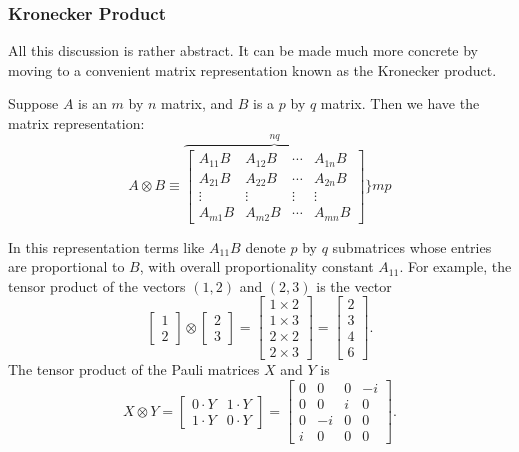 \subsubsection{Kronecker Product}

All this discussion is rather abstract. It can be made much more concrete by moving to a convenient matrix representation known as the Kronecker product. 

Suppose $A$ is an $m$ by $n$ matrix, and $B$ is a $p$ by $q$ matrix. Then we have the matrix representation:
\begin{equation}
    A \otimes B \equiv \overbrace{\left[\begin{array}{cccc}
A_{11} B & A_{12} B & \cdots & A_{1 n} B \\
A_{21} B & A_{22} B & \cdots & A_{2 n} B \\
\vdots & \vdots & \vdots & \vdots \\
A_{m 1} B & A_{m 2} B & \cdots & A_{m n} B
\end{array}\right]}^{n q}\} m p
\end{equation}

In this representation terms like $A_{11} B$ denote $p$ by $q$ submatrices whose entries are proportional to $B$, with overall proportionality constant $A_{11}$. For example, the tensor product of the vectors $(1,2)$ and $(2,3)$ is the vector
\begin{equation}
    \left[\begin{array}{l}
1 \\
2
\end{array}\right] \otimes\left[\begin{array}{l}
2 \\
3
\end{array}\right]=\left[\begin{array}{l}
1 \times 2 \\
1 \times 3 \\
2 \times 2 \\
2 \times 3
\end{array}\right]=\left[\begin{array}{l}
2 \\
3 \\
4 \\
6
\end{array}\right].
\end{equation}
The tensor product of the Pauli matrices $X$ and $Y$ is
\begin{equation}
    X \otimes Y=\left[\begin{array}{cc}
0 \cdot Y & 1 \cdot Y \\
1 \cdot Y & 0 \cdot Y
\end{array}\right]=\left[\begin{array}{cccc}
0 & 0 & 0 & -i \\
0 & 0 & i & 0 \\
0 & -i & 0 & 0 \\
i & 0 & 0 & 0
\end{array}\right].
\end{equation}

